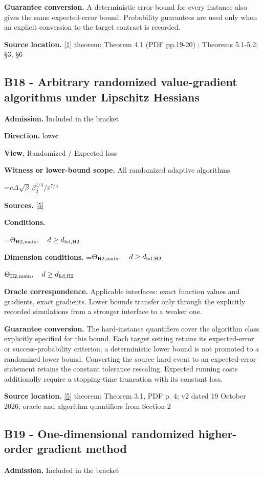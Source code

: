 \documentclass[10pt,a4paper]{article}
\newcommand{\AtlasMath}[1]{\par\begingroup\centering\setbox0=\hbox{$\displaystyle #1$}\ifdim\wd0>1.4\linewidth\typeout{ATLAS WIDE FORMULA: \the\wd0}\fi\ifdim\wd0>\linewidth\resizebox{\linewidth}{!}{\box0}\else\box0\fi\par\endgroup}
\newcommand{\AtlasInlineMath}[1]{\begingroup\setbox0=\hbox{$#1$}\ifdim\wd0>.4\linewidth\endgroup\AtlasMath{#1}\else\endgroup$#1$\fi}
\begin{document}
\textbf{Guarantee conversion.} A deterministic error bound for every instance also gives the same expected-error bound. Probability guarantees are used only when an explicit conversion to the target contract is recorded.

\textbf{Source location.} \href{https://arxiv.org/pdf/2610.02791}{[1]} theorem: Theorem 4.1 (PDF pp.19-20) ; Theorems 5.1-5.2; §3, §6

\subsection{B18 - Arbitrary randomized value-gradient algorithms under Lipschitz Hessians}
\textbf{Admission.} Included in the bracket

\textbf{Direction.} lower

\textbf{View.} Randomized / Expected loss

\textbf{Witness or lower-bound scope.} All randomized adaptive algorithms

\AtlasMath{c\Delta\sqrt\beta\,\beta_2^{1/4}/\varepsilon^{7/4}}
\textbf{Sources.} \href{https://arxiv.org/pdf/2610.00245v2}{[5]}

\textbf{Conditions.} 
\AtlasMath{\Theta_{\rm H2,main},\quad d\ge d_{\rm hd,H2}}


\textbf{Dimension conditions.} \AtlasInlineMath{\Theta_{\rm H2,main},\quad d\ge d_{\rm hd,H2}}

\textbf{Oracle correspondence.} Applicable interfaces: exact function values and gradients, exact gradients. Lower bounds transfer only through the explicitly recorded simulations from a stronger interface to a weaker one.

\textbf{Guarantee conversion.} The hard-instance quantifiers cover the algorithm class explicitly specified for this bound. Each target setting retains its expected-error or success-probability criterion; a deterministic lower bound is not promoted to a randomized lower bound. Converting the source hard event to an expected-error statement retains the constant tolerance rescaling. Expected running costs additionally require a stopping-time truncation with its constant loss.

\textbf{Source location.} \href{https://arxiv.org/pdf/2610.00245v2}{[5]} theorem: Theorem 3.1, PDF p. 4; v2 dated 19 October 2026; oracle and algorithm quantifiers from Section 2

\subsection{B19 - One-dimensional randomized higher-order gradient method}
\textbf{Admission.} Included in the bracket
\end{document}
